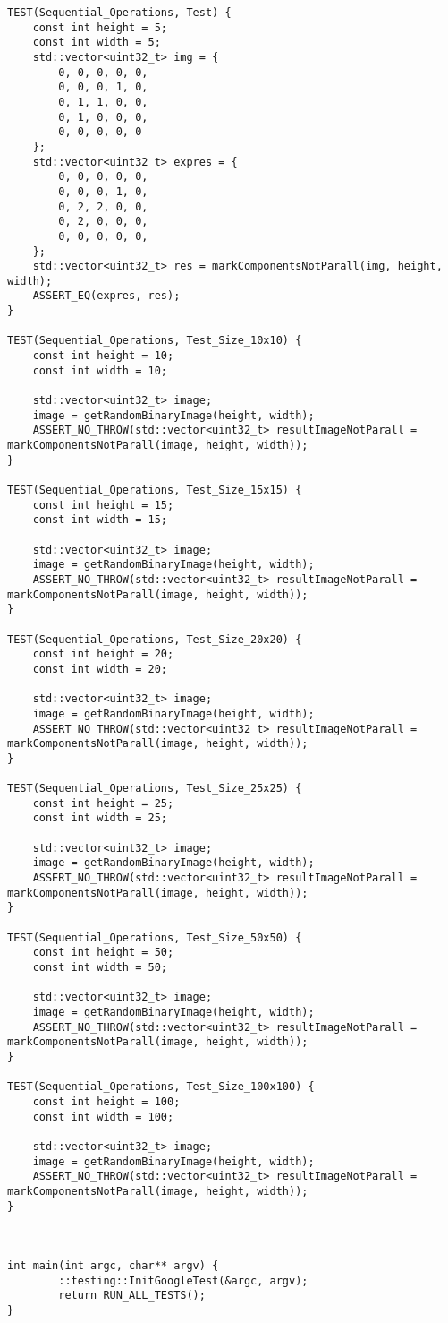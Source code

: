 \documentclass{report}
\begin{document}
\begin{lstlisting}
TEST(Sequential_Operations, Test) {
    const int height = 5;
    const int width = 5;
    std::vector<uint32_t> img = {
        0, 0, 0, 0, 0,
        0, 0, 0, 1, 0,
        0, 1, 1, 0, 0,
        0, 1, 0, 0, 0,
        0, 0, 0, 0, 0
    };
    std::vector<uint32_t> expres = {
        0, 0, 0, 0, 0,
        0, 0, 0, 1, 0,
        0, 2, 2, 0, 0,
        0, 2, 0, 0, 0,
        0, 0, 0, 0, 0,
    };
    std::vector<uint32_t> res = markComponentsNotParall(img, height, width);
    ASSERT_EQ(expres, res);
}

TEST(Sequential_Operations, Test_Size_10x10) {
    const int height = 10;
    const int width = 10;

    std::vector<uint32_t> image;
    image = getRandomBinaryImage(height, width);
    ASSERT_NO_THROW(std::vector<uint32_t> resultImageNotParall = markComponentsNotParall(image, height, width));
}

TEST(Sequential_Operations, Test_Size_15x15) {
    const int height = 15;
    const int width = 15;

    std::vector<uint32_t> image;
    image = getRandomBinaryImage(height, width);
    ASSERT_NO_THROW(std::vector<uint32_t> resultImageNotParall = markComponentsNotParall(image, height, width));
}

TEST(Sequential_Operations, Test_Size_20x20) {
    const int height = 20;
    const int width = 20;

    std::vector<uint32_t> image;
    image = getRandomBinaryImage(height, width);
    ASSERT_NO_THROW(std::vector<uint32_t> resultImageNotParall = markComponentsNotParall(image, height, width));
}

TEST(Sequential_Operations, Test_Size_25x25) {
    const int height = 25;
    const int width = 25;

    std::vector<uint32_t> image;
    image = getRandomBinaryImage(height, width);
    ASSERT_NO_THROW(std::vector<uint32_t> resultImageNotParall = markComponentsNotParall(image, height, width));
}

TEST(Sequential_Operations, Test_Size_50x50) {
    const int height = 50;
    const int width = 50;

    std::vector<uint32_t> image;
    image = getRandomBinaryImage(height, width);
    ASSERT_NO_THROW(std::vector<uint32_t> resultImageNotParall = markComponentsNotParall(image, height, width));
}

TEST(Sequential_Operations, Test_Size_100x100) {
    const int height = 100;
    const int width = 100;

    std::vector<uint32_t> image;
    image = getRandomBinaryImage(height, width);
    ASSERT_NO_THROW(std::vector<uint32_t> resultImageNotParall = markComponentsNotParall(image, height, width));
}



int main(int argc, char** argv) {
        ::testing::InitGoogleTest(&argc, argv);
        return RUN_ALL_TESTS();
}

\end{lstlisting}
\end{document}
